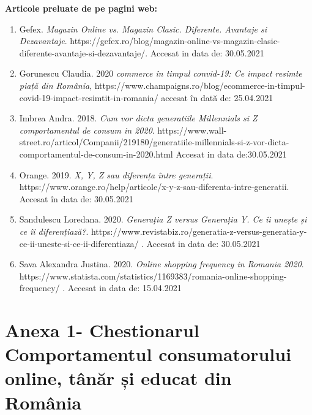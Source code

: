 \documentclass[a4paper, 12pt]{article}
\begin{document}
	\textbf{Articole preluate de pe pagini web:}
	\begin{enumerate}[1.]
		\item Gefex. \textit{Magazin Online vs. Magazin Clasic. Diferente. Avantaje si Dezavantaje}. https://gefex.ro/blog/magazin-online-vs-magazin-clasic-diferente-avantaje-si-dezavantaje/. Accesat in data de: 30.05.2021
		\item Gorunescu Claudia. 2020 \textit{commerce în timpul convid-19: Ce impact resimte piață din România}, https://www.champaigns.ro/blog/ecommerce-in-timpul-covid-19-impact-resimtit-in-romania/ accesat în dată de: 25.04.2021
		\item Imbrea Andra. 2018. \textit{Cum vor dicta generatiile Millennials si Z comportamentul de consum in 2020}. https://www.wall-street.ro/articol/Companii/219180/generatiile-millennials-si-z-vor-dicta-comportamentul-de-consum-in-2020.html Accesat in data de:30.05.2021
		\item Orange. 2019. \textit{X, Y, Z sau diferența între generații}. https://www.orange.ro/help/articole/x-y-z-sau-diferenta-intre-generatii. Accesat în data de: 30.05.2021
		\item Sandulescu Loredana. 2020. \textit{Generația Z versus Generația Y. Ce îi unește și ce îi diferențiază?}. https://www.revistabiz.ro/generatia-z-versus-generatia-y-ce-ii-uneste-si-ce-ii-diferentiaza/ . Accesat in data de: 30.05.2021
		\item Sava Alexandra Justina. 2020. \textit{Online shopping frequency in Romania 2020}. https://www.statista.com/statistics/1169383/romania-online-shopping-frequency/ . Accesat in data de: 15.04.2021
		
		
	\end{enumerate}
	
 
%
%

\newpage 
	\section*{Anexa 1- Chestionarul Comportamentul consumatorului online, tânăr și educat din România }	

\thispagestyle{empty}
\end{document}
